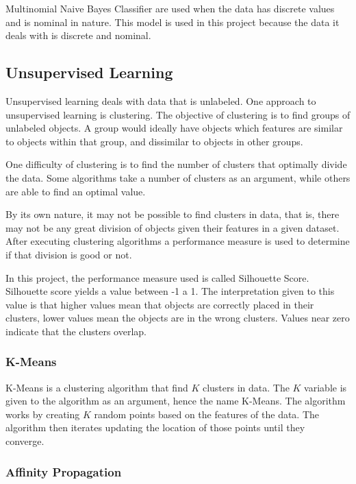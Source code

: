 Multinomial Naive Bayes Classifier are used when the data has discrete values
and is nominal in nature. This model is used in this project because the data
it deals with is discrete and nominal.~\cite{book_ml,book_dm_practical}

\subsection{Unsupervised Learning}

Unsupervised learning deals with data that is unlabeled. One approach to
unsupervised learning is clustering. The objective of clustering is to find
groups of unlabeled objects. A group would ideally have objects which features
are similar to objects within that group, and dissimilar to objects in other
groups.

One difficulty of clustering is to find the number of clusters that optimally
divide the data. Some algorithms take a number of clusters as an argument,
while others are able to find an optimal value.

By its own nature, it may not be possible to find clusters in data, that is,
there may not be any great division of objects given their features in a given
dataset. After executing clustering algorithms a performance measure is used to
determine if that division is good or not.

In this project, the performance measure used is called Silhouette Score.
Silhouette score yields a value between -1 a 1. The interpretation given to
this value is that higher values mean that objects are correctly placed in
their clusters, lower values mean the objects are in the wrong clusters. Values
near zero indicate that the clusters overlap.~\cite{book_ml,book_dm_practical}

\subsubsection{K-Means}

K-Means is a clustering algorithm that find $ K $ clusters in data. The $ K $
variable is given to the algorithm as an argument, hence the name K-Means. The
algorithm works by creating $ K $ random points based on the features of the
data. The algorithm then iterates updating the location of those points until
they converge.~\cite{book_ml,book_dm_practical}

\subsubsection{Affinity Propagation}

